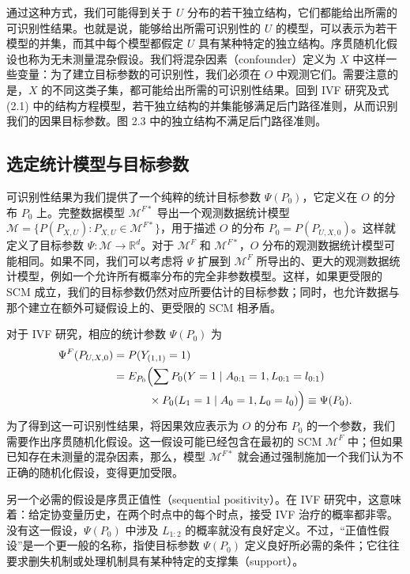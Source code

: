通过这种方式，我们可能得到关于 $U$ 分布的若干独立结构，它们都能给出所需的可识别性结果。也就是说，能够给出所需可识别性的 $U$ 的模型，可以表示为若干模型的并集，而其中每个模型都假定 $U$ 具有某种特定的独立结构。序贯随机化假设也称为无未测量混杂假设。我们将混杂因素（confounder）定义为 $X$ 中这样一些变量：为了建立目标参数的可识别性，我们必须在 $O$ 中观测它们。需要注意的是，$X$ 的不同这类子集，都可能给出所需的可识别性结果。回到 IVF 研究及式 (2.1) 中的结构方程模型，若干独立结构的并集能够满足后门路径准则，从而识别我们的因果目标参数。图 2.3 中的独立结构不满足后门路径准则。

\subsection{选定统计模型与目标参数}
\label{subsec:ch02-statistical-model-target}

可识别性结果为我们提供了一个纯粹的统计目标参数 $\Psi(P_0)$，它定义在 $O$ 的分布 $P_0$ 上。完整数据模型 $\mathcal M^{F*}$ 导出一个观测数据统计模型 $\mathcal M=\{P(P_{X,U}):P_{X,U}\in\mathcal M^{F*}\}$，用于描述 $O$ 的分布 $P_0=P(P_{U,X,0})$。这样就定义了目标参数 $\Psi\colon\mathcal M\to\mathbb R^d$。对于 $\mathcal M^F$ 和 $\mathcal M^{F*}$，$O$ 分布的观测数据统计模型可能相同。如果不同，我们可以考虑将 $\Psi$ 扩展到 $\mathcal M^F$ 所导出的、更大的观测数据统计模型，例如一个允许所有概率分布的完全非参数模型。这样，如果更受限的 SCM 成立，我们的目标参数仍然对应所要估计的目标参数；同时，也允许数据与那个建立在额外可疑假设上的、更受限的 SCM 相矛盾。

对于 IVF 研究，相应的统计参数 $\Psi(P_0)$ 为
\[
 \begin{aligned}
 \Psi^F(P_{U,X,0})&=P(Y_{(1,1)}=1)\\
 &=E_{P_0}\Bigl(\sum P_0(Y=1\mid A_{0:1}=1,L_{0:1}=l_{0:1})\\
 &\hspace{3.2em}{}\times P_0(L_1=1\mid A_0=1,L_0=l_0)\Bigr)
 \equiv\Psi(P_0).
 \end{aligned}
\]
为了得到这一可识别性结果，将因果效应表示为 $O$ 的分布 $P_0$ 的一个参数，我们需要作出序贯随机化假设。这一假设可能已经包含在最初的 SCM $\mathcal M^F$ 中；但如果已知存在未测量的混杂因素，那么，模型 $\mathcal M^{F*}$ 就会通过强制施加一个我们认为不正确的随机化假设，变得更加受限。

另一个必需的假设是序贯正值性（sequential positivity）。在 IVF 研究中，这意味着：给定协变量历史，在两个时点中的每个时点，接受 IVF 治疗的概率都非零。没有这一假设，$\Psi(P_0)$ 中涉及 $L_{1:2}$ 的概率就没有良好定义。不过，“正值性假设”是一个更一般的名称，指使目标参数 $\Psi(P_0)$ 定义良好所必需的条件；它往往要求删失机制或处理机制具有某种特定的支撑集（support）。

